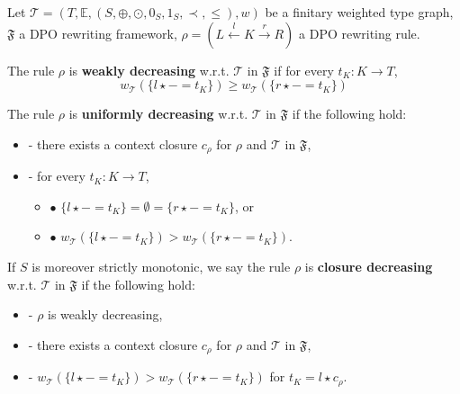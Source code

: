 \begin{definition}
    \label{def:decreasing_rule}
    Let $\mathcal{T} = (T,\mathbb{E}, (S, \oplus, \odot, 0_S, 1_S, \prec, \leq),w)$ be a finitary weighted type graph, \(\mathfrak{F}\) a DPO rewriting framework, $\rho = (L \overset{l}{\leftarrow} K \overset{r}{\rightarrow} R)$ a DPO rewriting rule.

    \noindent
    The rule $\rho$ is \textbf{weakly decreasing} w.r.t. $\mathcal{T}$ in $\mathfrak{F}$ if 
            for every $t_K : K \to T$,
                $$ 
                  w_\mathcal{T}(\{l \star - = t_K\}) \geq w_\mathcal{T}(\{r\star - = t_K\})$$
           
    \noindent
    The rule $\rho$ is \textbf{uniformly decreasing} w.r.t. $\mathcal{T}$ in $\mathfrak{F}$ if the following hold:
        \begin{itemize}
            \item[]- there exists a context closure $c_\rho$ for $\rho$ and $\mathcal{T}$ in $\mathfrak{F}$, 
            \item[]- for every $t_K : K \to T$,
            \begin{itemize}
                \item[] $\bullet$ $\{l \star - = t_K\} = \emptyset = \{r \star - = t_K\}$, or
                \item[] $\bullet$ $w_\mathcal{T}(\{l \star - = t_K\}) >   w_\mathcal{T}(\{r \star - = t_K\}) $.
            \end{itemize}
        \end{itemize}  
         
    \noindent
   If $S$ is moreover strictly monotonic, we say the rule $\rho$ is
            \textbf{closure decreasing} w.r.t. $\mathcal{T}$ in $\mathfrak{F}$ if the following hold:
            \begin{itemize}
                \item[]- $\rho$ is weakly decreasing,
                \item[]- there exists a context closure $c_\rho$ for $\rho$ and $\mathcal{T}$ in $\mathfrak{F}$,
                \item[]- $w_\mathcal{T}(\{l \star - = t_K\})  >  w_\mathcal{T}(\{r \star - = t_K\})$ for $t_K = l \star c_\rho$.
            \end{itemize}
\end{definition}

